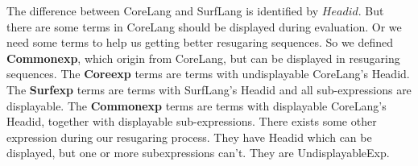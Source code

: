 \begin{centering}
	\framebox[38em][c]{
		\parbox[t]{38em}{
			\[
			\begin{array}{rcl}
			\mbox{Exp} &::=& \mbox{DisplayableExp}\\
			&|& \mbox{UndisplayableExp}\\
			\end{array}
			\]
			\[
			\begin{array}{rcl}
			\mbox{DisplayableExp} &::=& \mbox{Surfexp}\\
			&|& \mbox{Commonexp}
			\end{array}
			\]

			\[
			\begin{array}{rcl}
			\mbox{UndisplayableExp} &::=& \mbox{Coreexp}\\
			&|& \mbox{OtherSurfexp}\\
			&|& \mbox{OtherCommonexp}
			\end{array}
			\]
			
			\[
			\begin{array}{rcl}
			\mbox{Coreexp} &::=& (\mbox{CoreHead}~\mbox{Exp}*)
			\end{array}
			\]
			
			\[
			\begin{array}{rcl}
			\mbox{Surfexp} &::=& (\mbox{SurfHead}~\mbox{DisplayableExp}*)
			\end{array}
			\]
			
			\[
			\begin{array}{rcl}
			\mbox{Commonexp} &::=& (\mbox{CommonHead}~\mbox{DisplayableExp}*)\\
			&|& \mbox{Value}\\
			&|& \mbox{Variable}
			\end{array}
			\]
			
			\[
			\begin{array}{rcl}
			\mbox{OtherSurfexp} &::=& (\mbox{SurfHead}~\mbox{Exp}*~\mbox{UndisplayableExp}~\mbox{Exp}*)
			\end{array}
			\]
			
			\[
			\begin{array}{rcl}
			\mbox{OtherCommonexp} &::=& (\mbox{CommonHead}~\mbox{Exp}*~\mbox{UndisplayableExp}~\mbox{Exp}*)
			\end{array}
			\]
		}
	}
\end{centering}

The difference between CoreLang and SurfLang is identified by $Headid$. But there are some terms in CoreLang should be displayed during evaluation. Or we need some terms to help us getting better resugaring sequences. So we defined {\bfseries Commonexp}, which origin from CoreLang, but can be displayed in resugaring sequences. The {\bfseries Coreexp} terms are terms with undisplayable CoreLang's Headid. The {\bfseries Surfexp} terms are terms with SurfLang's Headid and all sub-expressions are displayable. The {\bfseries Commonexp} terms are terms with displayable CoreLang's Headid, together with displayable sub-expressions. There exists some other expression during our resugaring process. They have Headid which can be displayed, but one or more subexpressions can't. They are UndisplayableExp.


